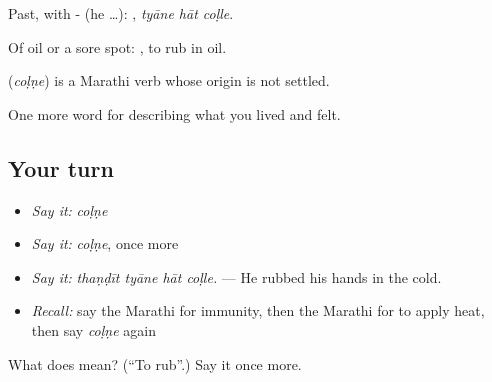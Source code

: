 Past, with - (he …):   , \emph{tyāne hāt coḷle}.

Of oil or a sore spot:  , to rub in oil.

\begin{cousinweb}
\textbf{} (\emph{coḷṇe}) is a Marathi verb whose origin is not settled.
\end{cousinweb}

\begin{grammarlens}[title={What you've built}]
One more word for describing what you lived and felt.
\end{grammarlens}

\subsection*{Your turn}
\begin{itemize}
\raggedright
  \item \emph{Say it:} \emph{coḷṇe}
  \item \emph{Say it:} \emph{coḷṇe}, once more
  \item \emph{Say it:} \emph{thaṇḍīt tyāne hāt coḷle.} — He rubbed his hands in the cold.
  \item \emph{Recall:} say the Marathi for immunity, then the Marathi for to apply heat, then say \emph{coḷṇe} again
\end{itemize}

\begin{tcolorbox}[breakable,colback=teal!4,colframe=teal!35!black,title={Before you move on}]
What does  mean? (\textquotedblleft{}To rub\textquotedblright{}.) Say it once more.
\end{tcolorbox}
